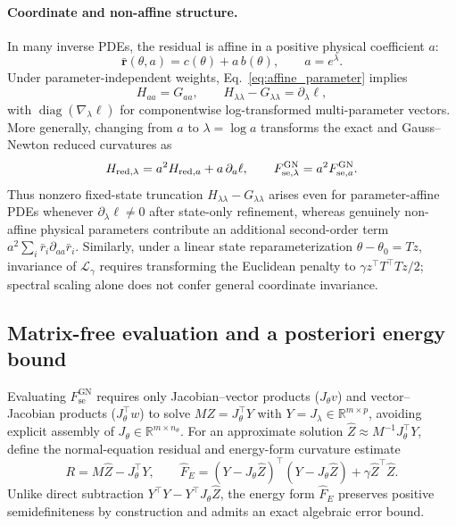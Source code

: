 \documentclass[preprint,11pt]{elsarticle}
\newcommand{\RR}{\mathbb R}
\newcommand{\rbar}{\bar{\bm r}}
\newcommand{\Jt}{J_\theta}\newcommand{\Jl}{J_\lambda}
\newcommand{\Fse}{F_{\mathrm{se}}^{\mathrm{GN}}}
\begin{document}
\paragraph{Coordinate and non-affine structure.}
\label{sec:coordinate_identity}
In many inverse PDEs, the residual is affine in a positive physical coefficient $a$:
\begin{equation}
 \rbar(\theta,a)=c(\theta)+a\,b(\theta),\qquad a=e^\lambda.
 \label{eq:affine_parameter}
\end{equation}
Under parameter-independent weights, Eq.~\eqref{eq:affine_parameter} implies
\begin{equation}
 H_{aa}=G_{aa},\qquad H_{\lambda\lambda}-G_{\lambda\lambda}=\partial_\lambda\ell,
 \label{eq:score_truncation}
\end{equation}
with $\operatorname{diag}(\nabla_\lambda\ell)$ for componentwise log-transformed multi-parameter vectors.
More generally, changing from $a$ to $\lambda=\log a$ transforms the exact and Gauss--Newton reduced curvatures as
\begin{equation}
 H_{{\rm red},\lambda}=a^2H_{{\rm red},a}+a\,\partial_a\ell,\qquad
 F_{{\rm se},\lambda}^{\rm GN}=a^2F_{{\rm se},a}^{\rm GN}.
 \label{eq:coordinate_change}
\end{equation}
Thus nonzero fixed-state truncation $H_{\lambda\lambda}-G_{\lambda\lambda}$ arises even for parameter-affine PDEs whenever $\partial_\lambda\ell\ne 0$ after state-only refinement, whereas genuinely non-affine physical parameters contribute an additional second-order term $a^2\sum_i\bar r_i\partial_{aa}\bar r_i$.
Similarly, under a linear state reparameterization $\theta-\theta_0=Tz$, invariance of $\mathcal L_\gamma$ requires transforming the Euclidean penalty to $\gamma z^\top T^\top Tz/2$; spectral scaling alone does not confer general coordinate invariance.

\subsection{Matrix-free evaluation and a posteriori energy bound}
\label{sec:matrix_free}

Evaluating $\Fse$ requires only Jacobian--vector products ($\Jt v$) and vector--Jacobian products ($\Jt^\top w$) to solve $MZ=\Jt^\top Y$ with $Y=\Jl\in\RR^{m\times p}$, avoiding explicit assembly of $\Jt\in\RR^{m\times n_\theta}$.
For an approximate solution $\widehat Z\approx M^{-1}\Jt^\top Y$, define the normal-equation residual and energy-form curvature estimate
\begin{equation}
 R=M\widehat Z-\Jt^\top Y,\qquad
 \widehat F_E=(Y-\Jt\widehat Z)^\top(Y-\Jt\widehat Z)+\gamma\widehat Z^\top\widehat Z.
 \label{eq:approximate_energy}
\end{equation}
Unlike direct subtraction $Y^\top Y - Y^\top\Jt\widehat Z$, the energy form $\widehat F_E$ preserves positive semidefiniteness by construction and admits an exact algebraic error bound.
\end{document}
